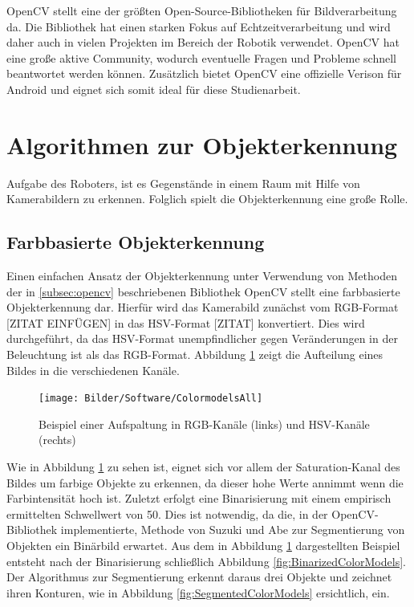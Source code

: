 OpenCV \cite{opencv_library, bradski2008learning} stellt eine der größten Open-Source-Bibliotheken für Bildverarbeitung da. Die Bibliothek hat einen starken Fokus auf Echtzeitverarbeitung und wird daher auch in vielen Projekten im Bereich der Robotik verwendet. OpenCV hat eine große aktive Community, wodurch eventuelle Fragen und Probleme schnell beantwortet werden können. Zusätzlich bietet OpenCV eine offizielle Verison für Android und eignet sich somit ideal für diese Studienarbeit.


\section{Algorithmen zur Objekterkennung}
\label{sec:Objekterkennung}

Aufgabe des Roboters, ist es Gegenstände in einem Raum mit Hilfe von Kamerabildern zu erkennen. Folglich spielt die Objekterkennung eine große Rolle.

\subsection{Farbbasierte Objekterkennung}
Einen einfachen Ansatz der Objekterkennung unter Verwendung von Methoden der in \ref{subsec:opencv} beschriebenen Bibliothek OpenCV stellt eine farbbasierte Objekterkennung dar. Hierfür wird das Kamerabild zunächst vom RGB-Format [ZITAT EINFÜGEN] in das HSV-Format [ZITAT] konvertiert. Dies wird durchgeführt, da das HSV-Format unempfindlicher gegen Veränderungen in der Beleuchtung ist als das RGB-Format. Abbildung \ref{fig:ColorModels} zeigt die Aufteilung eines Bildes in die verschiedenen Kanäle.

\begin{figure}[h]
\centering
\texttt{[image: Bilder/Software/ColormodelsAll]}
\caption{Beispiel einer Aufspaltung in RGB-Kanäle (links) und HSV-Kanäle (rechts)}
\label{fig:ColorModels}
\end{figure}

Wie in Abbildung \ref{fig:ColorModels} zu sehen ist, eignet sich vor allem der Saturation-Kanal des Bildes um farbige Objekte zu erkennen, da dieser hohe Werte annimmt wenn die Farbintensität hoch ist. Zuletzt erfolgt eine Binarisierung mit einem empirisch ermittelten Schwellwert von 50. Dies ist notwendig, da die, in der OpenCV-Bibliothek implementierte, Methode von Suzuki und Abe \cite{suzuki1985topological} zur Segmentierung von Objekten ein Binärbild erwartet. Aus dem in Abbildung \ref{fig:ColorModels} dargestellten Beispiel entsteht nach der Binarisierung schließlich Abbildung \ref{fig:BinarizedColorModels}. Der Algorithmus zur Segmentierung erkennt daraus drei Objekte und zeichnet ihren Konturen, wie in Abbildung \ref{fig:SegmentedColorModels} ersichtlich, ein.

